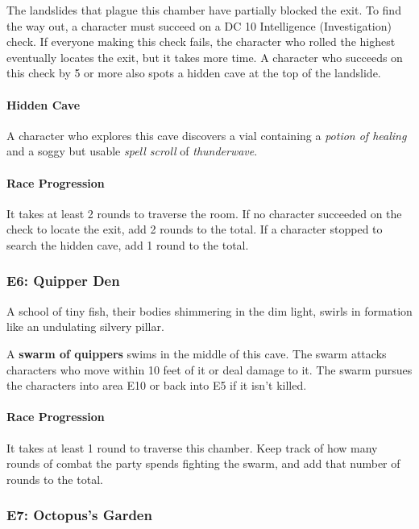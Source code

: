 \documentclass[a4paper, 11pt, bg=full, twocolumn, nooutline]{dndbook}
\begin{document}
The landslides that plague this chamber have partially blocked the exit. To find the way out, a character must succeed on a DC 10 Intelligence (Investigation) check. If everyone making this check fails, the character who rolled the highest eventually locates the exit, but it takes more time. A character who succeeds on this check by 5 or more also spots a hidden cave at the top of the landslide.

\paragraph{Hidden Cave}

A character who explores this cave discovers a vial containing a \textit{potion of healing} and a soggy but usable \textit{spell scroll} of \textit{thunderwave}.

\paragraph{Race Progression}

It takes at least 2 rounds to traverse the room. If no character succeeded on the check to locate the exit, add 2 rounds to the total. If a character stopped to search the hidden cave, add 1 round to the total.

\subsubsection{E6: Quipper Den}

\begin{DndReadAloud}
A school of tiny fish, their bodies shimmering in the dim light, swirls in formation like an undulating silvery pillar.
\end{DndReadAloud}

A \textbf{swarm of quippers} swims in the middle of this cave. The swarm attacks characters who move within 10 feet of it or deal damage to it. The swarm pursues the characters into area E10 or back into E5 if it isn't killed.

\paragraph{Race Progression}

It takes at least 1 round to traverse this chamber. Keep track of how many rounds of combat the party spends fighting the swarm, and add that number of rounds to the total.

\subsubsection{E7: Octopus's Garden}
\end{document}

